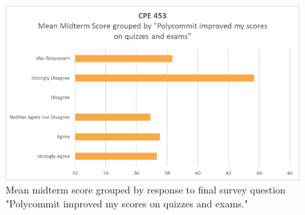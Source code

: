 \begin{figure}[h]
	\includegraphics[width=1.0\linewidth]{figures/improved-vs-score}
	\caption{Mean midterm score grouped by response to final survey question "Polycommit improved my scores on quizzes and exams."}
	\label{fig:overconfidence}
\end{figure}



 